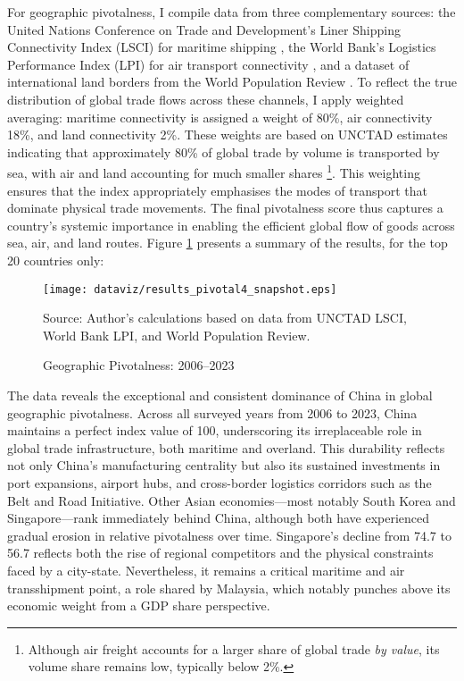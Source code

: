 \documentclass[11pt]{article}
\begin{document}
For geographic pivotalness, I compile data from three complementary sources: the United Nations Conference on Trade and Development’s Liner Shipping Connectivity Index (LSCI) for maritime shipping \citep{unctad2023lsci}, the World Bank’s Logistics Performance Index (LPI) for air transport connectivity \citep{worldbank2023lpi}, and a dataset of international land borders from the World Population Review \citep{wpr2025landborders}. To reflect the true distribution of global trade flows across these channels, I apply weighted averaging: maritime connectivity is assigned a weight of 80\%, air connectivity 18\%, and land connectivity 2\%. These weights are based on UNCTAD estimates indicating that approximately 80\% of global trade by volume is transported by sea, with air and land accounting for much smaller shares \citep{unctad2023}\footnote{Although air freight accounts for a larger share of global trade \textit{by value}, its volume share remains low, typically below 2\%.}. This weighting ensures that the index appropriately emphasises the modes of transport that dominate physical trade movements. The final pivotalness score thus captures a country’s systemic importance in enabling the efficient global flow of goods across sea, air, and land routes. Figure \ref{fig:pivotal_geographic} presents a summary of the results, for the top 20 countries only:

\begin{figure}[H]
	\caption{Geographic Pivotalness: 2006–2023}
	\label{fig:pivotal_geographic}
	\centering
        \phantom{a}
	\texttt{[image: dataviz/results\_pivotal4\_snapshot.eps]}

	{\footnotesize Source: Author's calculations based on data from UNCTAD LSCI, World Bank LPI, and World Population Review.}
\end{figure}

The data reveals the exceptional and consistent dominance of China in global geographic pivotalness. Across all surveyed years from 2006 to 2023, China maintains a perfect index value of 100, underscoring its irreplaceable role in global trade infrastructure, both maritime and overland. This durability reflects not only China’s manufacturing centrality but also its sustained investments in port expansions, airport hubs, and cross-border logistics corridors such as the Belt and Road Initiative. Other Asian economies—most notably South Korea and Singapore—rank immediately behind China, although both have experienced gradual erosion in relative pivotalness over time. Singapore’s decline from 74.7 to 56.7 reflects both the rise of regional competitors and the physical constraints faced by a city-state. Nevertheless, it remains a critical maritime and air transshipment point, a role shared by Malaysia, which notably punches above its economic weight from a GDP share perspective.
\end{document}
